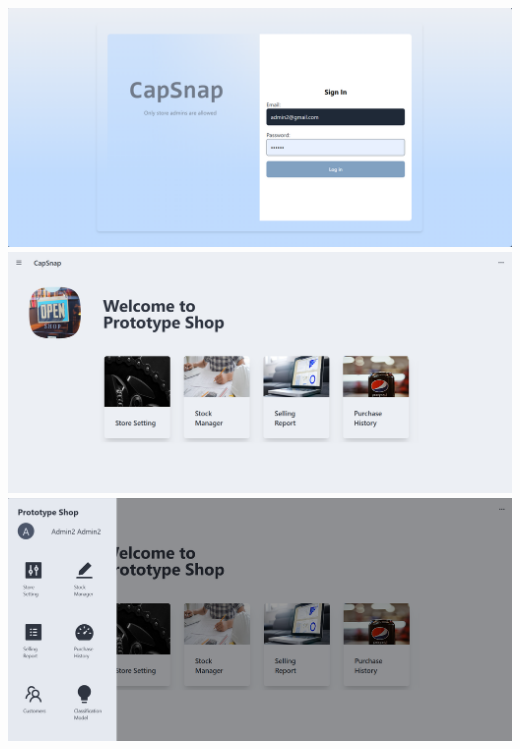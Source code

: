  {
  \includegraphics[scale=0.35]{pic/ui/w27.png}
 }\\
 {
  \includegraphics[scale=0.35]{pic/ui/w1.png}
 }\\
 {
  \includegraphics[scale=0.35]{pic/ui/w2.png}
 }\\

